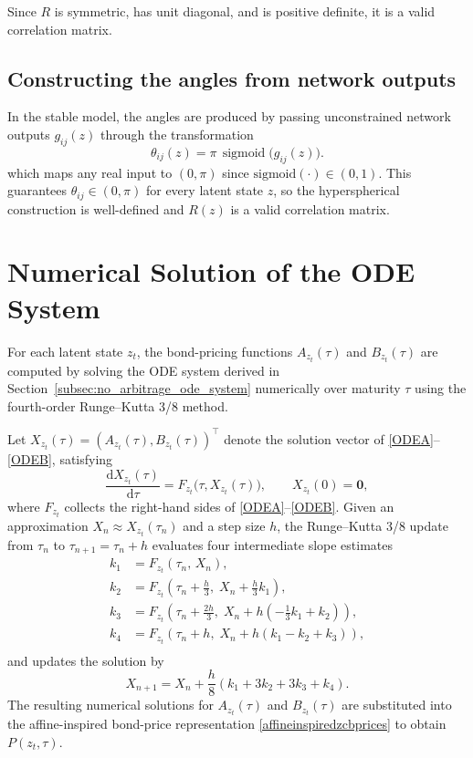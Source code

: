 Since $R$ is symmetric, has unit diagonal, and is positive definite, it is a valid correlation matrix.

\subsection{Constructing the angles from network outputs}

In the stable model, the angles are produced by passing unconstrained network outputs
\(g_{ij}(z)\) through the transformation
\[
\theta_{ij}(z)
=
\pi\,\operatorname{sigmoid}\bigl(g_{ij}(z)\bigr).
\]
which maps any real input to $(0,\pi)$ since $\text{sigmoid}(\cdot)\in(0,1)$. This guarantees $\theta_{ij}\in(0,\pi)$ for every latent state $z$, so the hyperspherical construction is well-defined and $R(z)$ is a valid correlation matrix.




\section{Numerical Solution of the ODE System}
\label{app:rk38}

For each latent state $z_t$, the bond-pricing functions $A_{z_t}(\tau)$ and $B_{z_t}(\tau)$ are computed by solving the ODE system derived in 
Section~\ref{subsec:no_arbitrage_ode_system} numerically over maturity $\tau$ using the fourth-order Runge--Kutta 3/8 method.

Let $X_{z_t}(\tau)=(A_{z_t}(\tau),B_{z_t}(\tau))^\top$ denote the solution 
vector of \eqref{ODEA}--\eqref{ODEB}, satisfying
\[
\frac{\mathrm{d}X_{z_t}(\tau)}{\mathrm{d}\tau}
=
F_{z_t}\bigl(\tau,X_{z_t}(\tau)\bigr),
\qquad
X_{z_t}(0)=\mathbf{0},
\]
where $F_{z_t}$ collects the right-hand sides of \eqref{ODEA}--\eqref{ODEB}. 
Given an approximation $X_n\approx X_{z_t}(\tau_n)$ and a step size $h$, the Runge--Kutta 3/8 update from $\tau_n$ to $\tau_{n+1}=\tau_n+h$ evaluates four intermediate slope estimates
\begin{align*}
    k_1&=F_{z_t}(\tau_n,\,X_n),\\
    k_2&=F_{z_t}\!\left(\tau_n+\frac{h}{3},\;X_n+\frac{h}{3}k_1\right),\\
    k_3&=F_{z_t}\!\left(\tau_n+\frac{2h}{3},\;
X_n+h\!\left(-\frac{1}{3}k_1+k_2\right)\right),\\
    k_4&=F_{z_t}\!\left(\tau_n+h,\;X_n+h\left(k_1-k_2+k_3\right)\right),\\
\end{align*}
and updates the solution by
\[
X_{n+1}
=
X_n
+
\frac{h}{8}\left(k_1+3k_2+3k_3+k_4\right).
\]
The resulting numerical solutions for $A_{z_t}(\tau)$ and $B_{z_t}(\tau)$ 
are substituted into the affine-inspired bond-price representation 
\eqref{affineinspiredzcbprices} to obtain $P(z_t,\tau)$.












